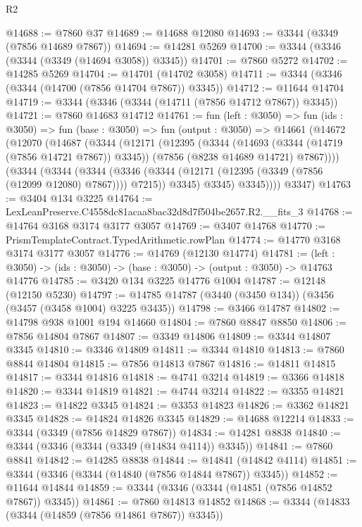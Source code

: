 \begin{lexlean}{R2}
\begin{coremodule}
@14688 := @7860 @37
@14689 := @14688 @12080
@14693 := @3344 (@3349 (@7856 @14689 @7867))
@14694 := @14281 @5269
@14700 := @3344 (@3346 (@3344 (@3349 (@14694 @3058)) @3345))
@14701 := @7860 @5272
@14702 := @14285 @5269
@14704 := @14701 (@14702 @3058)
@14711 := @3344 (@3346 (@3344 (@14700 (@7856 @14704 @7867)) @3345))
@14712 := @11644 @14704
@14719 := @3344 (@3346 (@3344 (@14711 (@7856 @14712 @7867)) @3345))
@14721 := @7860 @14683 @14712
@14761 := fun (left : @3050) =>
  fun (ids : @3050) =>
  fun (base : @3050) =>
  fun (output : @3050) =>
  @14661
    (@14672
      (@12070
        (@14687
          (@3344
            (@12171
              (@12395
                (@3344
                  (@14693 (@3344 (@14719 (@7856 @14721 @7867)) @3345))
                  (@7856 (@8238 @14689 @14721) @7867))))
            (@3344
              (@3344
                (@3344
                  (@3346 (@3344 (@12171 (@12395 (@3349 (@7856 (@12099 @12080) @7867)))) @7215))
                  @3345)
                @3345)
              @3345))))
      @3347)
@14763 := @3404 @134 @3225
@14764 := LexLeanPreserve.C4558dc81acaa8bac32d8d7f504be2657.R2.__fits_3
@14768 := @14764 @3168 @3174 @3177 @3057
@14769 := @3407 @14768
@14770 := PrismTemplateContract.TypedArithmetic.rowPlan
@14774 := @14770 @3168 @3174 @3177 @3057
@14776 := @14769 (@12130 @14774)
@14781 := (left : @3050) -> (ids : @3050) -> (base : @3050) -> (output : @3050) -> @14763 @14776
@14785 := @3420 @134 @3225 @14776 @1004
@14787 := @12148 (@12150 @5230)
@14797 := @14785 @14787 (@3440 (@3450 @134)) (@3456 (@3457 (@3458 @1004) @3225 @3435))
@14798 := @3466 @14787
@14802 := @14798 @938 @1001 @194 @14660
@14804 := @7860 @8847 @8850
@14806 := @7856 @14804 @7867
@14807 := @3349 @14806
@14809 := @3344 @14807 @3345
@14810 := @3346 @14809
@14811 := @3344 @14810
@14813 := @7860 @8844 @14804
@14815 := @7856 @14813 @7867
@14816 := @14811 @14815
@14817 := @3344 @14816
@14818 := @4741 @3214
@14819 := @3366 @14818
@14820 := @3344 @14819
@14821 := @4744 @3214
@14822 := @3355 @14821
@14823 := @14822 @3345
@14824 := @3353 @14823
@14826 := @3362 @14821 @3345
@14828 := @14824 @14826 @3345
@14829 := @14688 @12214
@14833 := @3344 (@3349 (@7856 @14829 @7867))
@14834 := @14281 @8838
@14840 := @3344 (@3346 (@3344 (@3349 (@14834 @4114)) @3345))
@14841 := @7860 @8841
@14842 := @14285 @8838
@14844 := @14841 (@14842 @4114)
@14851 := @3344 (@3346 (@3344 (@14840 (@7856 @14844 @7867)) @3345))
@14852 := @11644 @14844
@14859 := @3344 (@3346 (@3344 (@14851 (@7856 @14852 @7867)) @3345))
@14861 := @7860 @14813 @14852
@14868 := @3344 (@14833 (@3344 (@14859 (@7856 @14861 @7867)) @3345))

\end{coremodule}
\end{lexlean}
